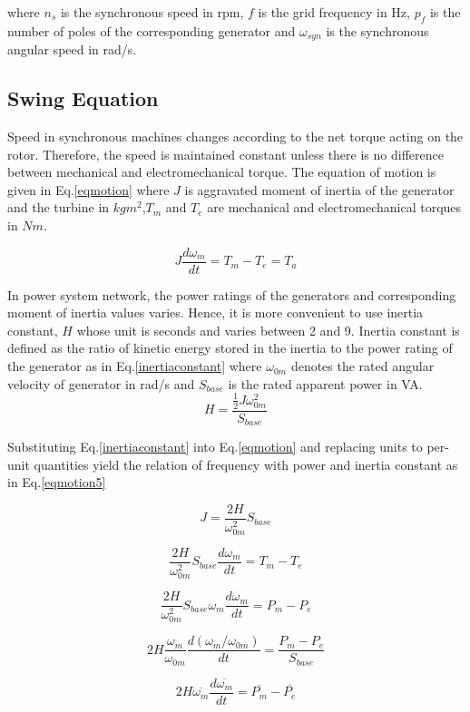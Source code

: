 where $n_{s}$ is the synchronous speed in rpm, $f$ is the grid frequency in Hz, $p_{f}$ is the number of poles of the corresponding generator and $\omega_{syn}$ is the synchronous angular speed in rad/s.

\subsection{Swing Equation}
Speed in synchronous machines changes according to the net torque acting on the rotor. Therefore, the speed is maintained constant unless there is no difference between mechanical and electromechanical torque. The equation of motion is given in Eq.\ref{eqmotion} where $J$ is aggravated moment of inertia of the generator and the turbine in $kgm^{2}$,$T_{m}$ and $T_{e}$ are mechanical and electromechanical torques in $Nm$.

\begin{equation}
J\frac{d\omega_{m}}{dt}=T_{m}-T_{e}=T_{a}
\label{eqmotion}
\end{equation}

In power system network, the power ratings of the generators and corresponding moment of inertia values varies. Hence, it is more convenient to use inertia constant, $H$ whose unit is seconds and varies between 2 and 9. Inertia constant is defined as the ratio of kinetic energy stored in the inertia to the power rating of the generator as in Eq.\ref{inertiaconstant} where $\omega_{0m}$ denotes the rated angular velocity of generator in rad/s and $S_{base}$ is the rated apparent power in VA. 
\begin{equation}
H=\frac{{\frac{1}{2}}J\omega_{0m}^{2}}{S_{base}}
\label{inertiaconstant}
\end{equation}

Substituting Eq.\ref{inertiaconstant} into Eq.\ref{eqmotion} and replacing units to per-unit quantities yield the relation of frequency with power and inertia constant as in Eq.\ref{eqmotion5}

\begin{equation}
J=\frac{2H}{\omega_{0m}^{2}}{S_{base}}
\label{inertiaconstant2}
\end{equation}

\begin{equation}
\frac{2H}{\omega_{0m}^{2}}{S_{base}}\frac{d\omega_{m}}{dt}=T_{m}-T_{e}
\label{eqmotion2}
\end{equation}

\begin{equation}
\frac{2H}{\omega_{0m}^{2}}{S_{base}\omega_{m}}\frac{d\omega_{m}}{dt}=P_{m}-P_{e}
\label{eqmotion3}
\end{equation}

\begin{equation}
2H\frac{\omega_{m}}{\omega_{0m}}\frac{d(\omega_{m}/\omega_{0m})}{dt}=\frac{P_{m}-P_{e}}{S_{base}}
\label{eqmotion4}
\end{equation}

\begin{equation}
2H\overline{\omega_{m}}\frac{d\overline{\omega_{m}}}{dt}=\overline{P_{m}}-\overline{P_{e}}
\label{eqmotion5}
\end{equation}


